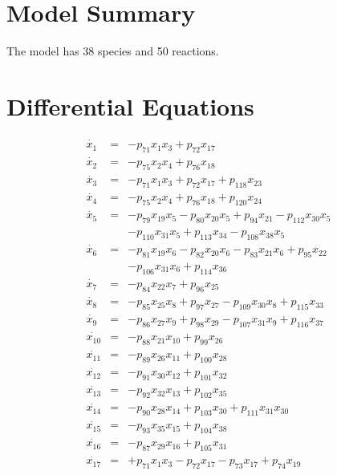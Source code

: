 \documentclass{article}
\begin{document}
\section{Model Summary}
The model has 38 species and 50 reactions.

\section{Differential Equations}
\begin{eqnarray*}
\dot{x_{1}}&=&  - p_{71} x_{1} x_{3} + p_{72} x_{17}
\\
\dot{x_{2}}&=&  - p_{75} x_{2} x_{4} + p_{76} x_{18}
\\
\dot{x_{3}}&=&  - p_{71} x_{1} x_{3} + p_{72} x_{17} + p_{118} x_{23}
\\
\dot{x_{4}}&=&  - p_{75} x_{2} x_{4} + p_{76} x_{18} + p_{120} x_{24}
\\
\dot{x_{5}}&=&  - p_{79} x_{19} x_{5} - p_{80} x_{20} x_{5} + p_{94} x_{21} - p_{112} x_{30} x_{5}\\ && - p_{110} x_{31} x_{5} + p_{113} x_{34} - p_{108} x_{38} x_{5}
\\
\dot{x_{6}}&=&  - p_{81} x_{19} x_{6} - p_{82} x_{20} x_{6} - p_{83} x_{21} x_{6} + p_{95} x_{22}\\ && - p_{106} x_{31} x_{6} + p_{114} x_{36}
\\
\dot{x_{7}}&=&  - p_{84} x_{22} x_{7} + p_{96} x_{25}
\\
\dot{x_{8}}&=&  - p_{85} x_{25} x_{8} + p_{97} x_{27} - p_{109} x_{30} x_{8} + p_{115} x_{33}
\\
\dot{x_{9}}&=&  - p_{86} x_{27} x_{9} + p_{98} x_{29} - p_{107} x_{31} x_{9} + p_{116} x_{37}
\\
\dot{x_{10}}&=&  - p_{88} x_{21} x_{10} + p_{99} x_{26}
\\
\dot{x_{11}}&=&  - p_{89} x_{26} x_{11} + p_{100} x_{28}
\\
\dot{x_{12}}&=&  - p_{91} x_{30} x_{12} + p_{101} x_{32}
\\
\dot{x_{13}}&=&  - p_{92} x_{32} x_{13} + p_{102} x_{35}
\\
\dot{x_{14}}&=&  - p_{90} x_{28} x_{14} + p_{103} x_{30} + p_{111} x_{31} x_{30}
\\
\dot{x_{15}}&=&  - p_{93} x_{35} x_{15} + p_{104} x_{38}
\\
\dot{x_{16}}&=&  - p_{87} x_{29} x_{16} + p_{105} x_{31}
\\
\dot{x_{17}}&=&  + p_{71} x_{1} x_{3} - p_{72} x_{17} - p_{73} x_{17} + p_{74} x_{19}
\\

\end{eqnarray*}
\end{document}
